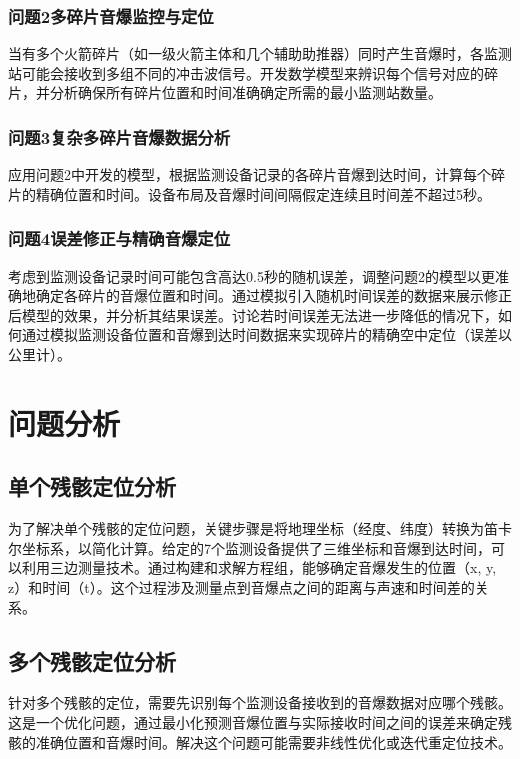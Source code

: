 \documentclass[withoutpreface,bwprint,12pt,a4paper]{cumcmthesis}
\begin{document}
\subsubsection{问题2多碎片音爆监控与定位}
当有多个火箭碎片（如一级火箭主体和几个辅助助推器）同时产生音爆时，各监测站可能会接收到多组不同的冲击波信号。开发数学模型来辨识每个信号对应的碎片，并分析确保所有碎片位置和时间准确确定所需的最小监测站数量。

\subsubsection{问题3复杂多碎片音爆数据分析}
应用问题2中开发的模型，根据监测设备记录的各碎片音爆到达时间，计算每个碎片的精确位置和时间。设备布局及音爆时间间隔假定连续且时间差不超过5秒。

\subsubsection{问题4误差修正与精确音爆定位}
考虑到监测设备记录时间可能包含高达0.5秒的随机误差，调整问题2的模型以更准确地确定各碎片的音爆位置和时间。通过模拟引入随机时间误差的数据来展示修正后模型的效果，并分析其结果误差。讨论若时间误差无法进一步降低的情况下，如何通过模拟监测设备位置和音爆到达时间数据来实现碎片的精确空中定位（误差以公里计）。

\section{问题分析}

\subsection{单个残骸定位分析}

为了解决单个残骸的定位问题，关键步骤是将地理坐标（经度、纬度）转换为笛卡尔坐标系，以简化计算。给定的7个监测设备提供了三维坐标和音爆到达时间，可以利用三边测量技术。通过构建和求解方程组，能够确定音爆发生的位置（x, y, z）和时间（t）。这个过程涉及测量点到音爆点之间的距离与声速和时间差的关系。

\subsection{多个残骸定位分析}

针对多个残骸的定位，需要先识别每个监测设备接收到的音爆数据对应哪个残骸。这是一个优化问题，通过最小化预测音爆位置与实际接收时间之间的误差来确定残骸的准确位置和音爆时间。解决这个问题可能需要非线性优化或迭代重定位技术。
\end{document}
